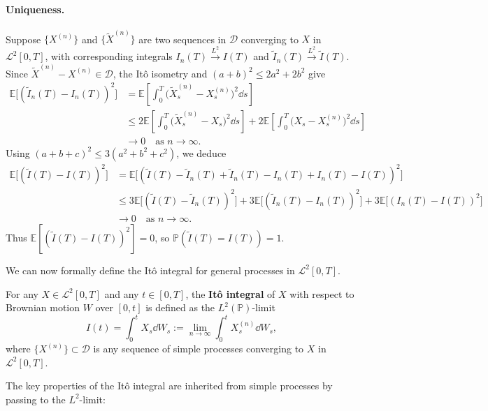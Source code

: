 \paragraph{Uniqueness.} Suppose $\{X^{(n)}\}$ and $\{\widetilde{X}^{(n)}\}$ are two sequences in $\mathcal{D}$ converging to $X$ in $\mathcal{L}^2[0, T]$, with corresponding integrals $I_n(T) \xrightarrow{L^2} I(T)$ and $\widetilde{I}_n(T) \xrightarrow{L^2} \widetilde{I}(T)$. Since $\widetilde{X}^{(n)} - X^{(n)} \in \mathcal{D}$, the It\^o isometry and $(a+b)^2 \le 2a^2 + 2b^2$ give
\begin{align*}
\mathbb{E}\big[(\widetilde{I}_n(T) - I_n(T))^2\big]
&= \mathbb{E}\left[\int_0^T \big(\widetilde{X}_s^{(n)} - X_s^{(n)}\big)^2 \dd s\right] \\
&\le 2\mathbb{E}\left[\int_0^T \big(\widetilde{X}_s^{(n)} - X_s\big)^2 \dd s\right] + 2\mathbb{E}\left[\int_0^T \big(X_s - X_s^{(n)}\big)^2 \dd s\right] \\
&\to 0 \quad \text{as } n \to \infty.
\end{align*}
Using $(a + b + c)^2 \le 3(a^2 + b^2 + c^2)$, we deduce
\begin{align*}
\mathbb{E}\big[(\widetilde{I}(T) - I(T))^2\big]
&= \mathbb{E}\big[(\widetilde{I}(T) - \widetilde{I}_n(T) + \widetilde{I}_n(T) - I_n(T) + I_n(T) - I(T))^2\big] \\
&\le 3\mathbb{E}\big[(\widetilde{I}(T) - \widetilde{I}_n(T))^2\big] + 3\mathbb{E}\big[(\widetilde{I}_n(T) - I_n(T))^2\big] + 3\mathbb{E}\big[(I_n(T) - I(T))^2\big] \\
&\to 0 \quad \text{as } n \to \infty.
\end{align*}
Thus $\mathbb{E}[(\widetilde{I}(T) - I(T))^2] = 0$, so $\mathbb{P}(\widetilde{I}(T) = I(T)) = 1$.

We can now formally define the It\^o integral for general processes in $\mathcal{L}^2[0, T]$.

\begin{definition}
\label{def:ito-integral-general}
For any $X \in \mathcal{L}^2[0, T]$ and any $t \in [0, T]$, the \textbf{It\^o integral} of $X$ with respect to Brownian motion $W$ over $[0, t]$ is defined as the $L^2(\mathbb{P})$-limit
\[
I(t) = \int_0^t X_s \dd W_s := \lim_{n \to \infty} \int_0^t X_s^{(n)} \dd W_s,
\]
where $\{X^{(n)}\} \subset \mathcal{D}$ is any sequence of simple processes converging to $X$ in $\mathcal{L}^2[0, T]$.
\end{definition}

The key properties of the It\^o integral are inherited from simple processes by passing to the $L^2$-limit:

